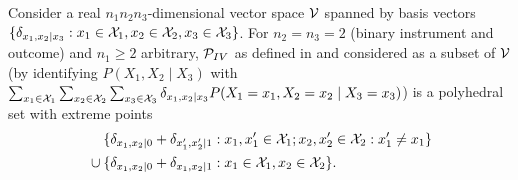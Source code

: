 \begin{Lem}\label{lem:extreme_points_IV_kernel}
  Consider a real $n_1 n_2 n_3$-dimensional vector space $\mathcal{V}$ spanned by basis vectors 
  $\{\delta_{x_1,x_2|x_3} : x_1 \in \mathcal{X}_1, x_2 \in \mathcal{X}_2, x_3 \in \mathcal{X}_3\}$.
  For $n_2 = n_3 = 2$ (binary instrument and outcome) and $n_1 \ge 2$ arbitrary, $\mathcal{P}_{IV}$ as defined in 
  and considered as a subset of $\mathcal{V}$ (by identifying $P(X_1,X_2 \mid X_3)$ with $\sum_{x_1\in\mathcal{X}_1}\sum_{x_2\in\mathcal{X}_2}\sum_{x_3\in\mathcal{X}_3} \delta_{x_1,x_2|x_3} P(X_1=x_1,X_2=x_2 \mid X_3=x_3)$)
  is a polyhedral set with extreme points
  \begin{equation*}\begin{split}
    & \phantom{{} \cup {}}\{\delta_{x_1,x_2|0} + \delta_{x_1',x_2'|1} : x_1,x_1' \in \CX_1; x_2,x_2' \in \CX_2 : x_1' \ne x_1\} \\
    & {} \cup \{\delta_{x_1,x_2|0} + \delta_{x_1,x_2|1} : x_1 \in \CX_1, x_2 \in \CX_2\}.
  \end{split}\end{equation*}
\end{Lem}
